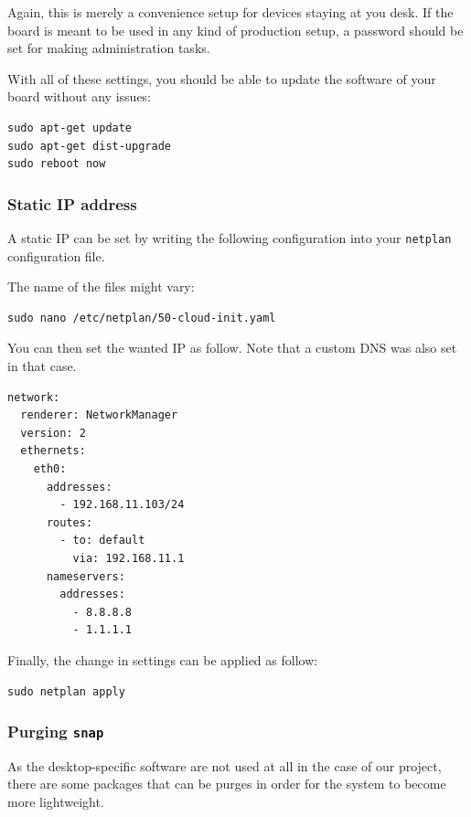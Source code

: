 \documentclass[10pt]{article}
\begin{document}
Again, this is merely a convenience setup for devices staying at you desk. If
the board is meant to be used in any kind of production setup, a password
should be set for making administration tasks.

With all of these settings, you should be able to update the software of your
board without any issues:
\begin{verbatim}
sudo apt-get update
sudo apt-get dist-upgrade
sudo reboot now
\end{verbatim}


\subsubsection{Static IP address}
\label{sec:org58e2cd9}
A static IP can be set by writing the following
configuration into your \texttt{netplan} configuration file.

The name of the files might vary:
\begin{verbatim}
sudo nano /etc/netplan/50-cloud-init.yaml
\end{verbatim}

You can then set the wanted IP as follow. Note that a custom DNS was
also set in that case.
\begin{verbatim}
network:
  renderer: NetworkManager
  version: 2
  ethernets:
    eth0:
      addresses:
        - 192.168.11.103/24
      routes:
        - to: default
          via: 192.168.11.1
      nameservers:
        addresses:
          - 8.8.8.8
          - 1.1.1.1
\end{verbatim}

Finally, the change in settings can be applied
as follow:

\begin{verbatim}
sudo netplan apply
\end{verbatim}

\subsubsection{Purging \texttt{snap}}
\label{sec:org79d4220}
As the desktop-specific software are not used at all in the case
of our project, there are some packages that can be purges in order for the
system to become more lightweight.
\end{document}
